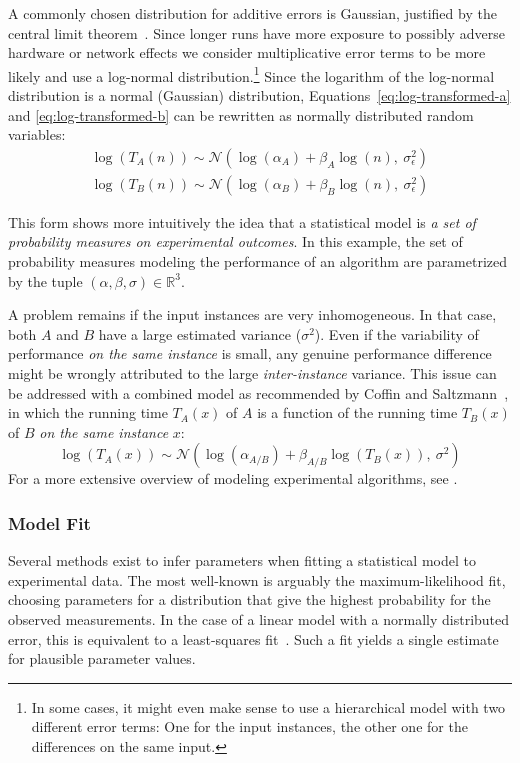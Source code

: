 \documentclass[algorithms,article,submit,moreauthors,pdftex]{Definitions/mdpi}
\begin{document}
A commonly chosen distribution for additive errors is Gaussian, justified by the central limit theorem~\cite{polya1920zentralen}.
Since longer runs have more exposure to possibly adverse hardware or network effects we consider multiplicative error terms to be more likely and use a log-normal distribution.\footnote{In some cases, it might even make sense to use a hierarchical model with two different error terms: One for the input instances, the other one for the differences on the same input.}
Since the logarithm of the log-normal distribution is a normal (Gaussian) distribution, Equations~\ref{eq:log-transformed-a} and \ref{eq:log-transformed-b} can be rewritten as normally distributed random variables:
\begin{align}
 \log(T_A(n)) \sim \mathcal{N}(\log(\alpha_A) + \beta_A  \log(n),\ \sigma_\epsilon^2)\label{eq:log-normal-a} \\
 \log(T_B(n)) \sim \mathcal{N}(\log(\alpha_B) + \beta_B  \log(n),\ \sigma_\epsilon^2)
\end{align}

This form shows more intuitively the idea that a statistical model is \emph{a set of probability measures on experimental outcomes}.
In this example, the set of probability measures modeling the performance of an algorithm are parametrized by the tuple $(\alpha, \beta, \sigma) \in \mathbb{R}^3$.

%
A problem remains if the input instances are very inhomogeneous.
In that case, both $A$ and $B$ have a large estimated variance ($\sigma^2$).
Even if the variability of performance \emph{on the same instance} is small, any genuine performance difference might be wrongly attributed to the large \emph{inter-instance} variance.
%
This issue can be addressed with a combined model as recommended by Coffin and Saltzmann~\cite{Coffin00}, in which the running time $T_A(x)$ of $A$ is a function of the running time $T_B(x)$ of $B$ \emph{on the same instance} $x$:
\begin{equation}
 \log(T_A(x)) \sim \mathcal{N}(\log(\alpha_{A/B}) + \beta_{A/B}  \log(T_B(x)),\ \sigma^2)\label{eq:relative-time-model}
\end{equation}
For a more extensive overview of modeling experimental algorithms, see \cite{McGeoch12}.

\subsubsection{Model Fit}
Several methods exist to infer parameters when fitting a statistical model to experimental data.
The most well-known is arguably the maximum-likelihood fit, choosing parameters for a distribution that give the highest probability for the observed measurements.
In the case of a linear model with a normally distributed error, this is equivalent to a least-squares fit~\cite{doi:10.1080/01621459.1976.10481508}.
Such a fit yields a single estimate for plausible parameter values.
\end{document}

